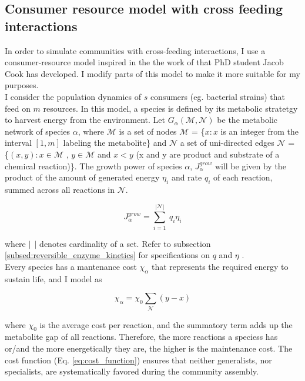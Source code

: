 \documentclass[titlepage,11pt]{article}
\begin{document}
\begin{linenumbers}
			\subsection{Consumer resource model with cross feeding interactions}
			In order to simulate communities with cross-feeding interactions, I use a consumer-resource model inspired in the the work of \citep{Marsland2019} that PhD student Jacob Cook has developed.  I modify parts of this model to make it more suitable for my purposes. \\
			I consider the population dynamics of $ s $ consumers (eg. bacterial strains) that feed on $ m $ resources. In this model,  a species  is defined by its metabolic stratetgy to harvest energy from the environment. Let $ G_{\alpha}(\mathcal{M}, \mathcal{N}) $ be the metabolic network of species $ \alpha $, where $ \mathcal{M} $ is a set of nodes $ \mathcal{M}  $ = \{$x:x $ is an integer from the interval $ [1, m]  $ labeling the metabolite\} and $ \mathcal{N} $ a set of uni-directed edges $ \mathcal{N}  $ = \{$ (x, y): x \in \mathcal{M} \textrm{ , } y \in \mathcal{M} $ and $ x < y $ (x and y are product and substrate of a chemical reaction)\}. The growth power of species $ \alpha $,  $ J^{grow}_{\alpha}$ will be given by the product of the amount of generated energy $ \eta_{i} $ and rate $ q_{i} $ of each reaction, summed across all reactions in $ \mathcal{N} $.
			\begin{linenomath*}	
			\begin{equation}
				J^{grow}_{\alpha} = \sum_{i = 1}^{|\mathcal{N}|} \ q_i \eta_i
			\end{equation}
			\end{linenomath*}
			where $ | \ \ | $ denotes cardinality of a set. Refer to subsection \ref{subsed:reversible_enzyme_kinetics} for specifications on $ q $ and  $ \eta $ .\\
			Every species has a mantenance cost $ \chi_{\alpha} $ that represents the required energy to sustain life, and I model as
			\begin{linenomath*}	
			\begin{equation}\label{eq:cost_function}
				\chi_{\alpha} = \chi_0\sum_{\mathcal{N}}(y - x)
			\end{equation}
			\end{linenomath*}
			where $ \chi_0 $ is the average cost per reaction, and the summatory term adds up the metabolite gap of all reactions. Therefore, the more reactions a speciess has or/and the more energetically they are, the higher is the maintenance cost. The cost function (Eq. \ref{eq:cost_function}) ensures that neither generalists, nor specialists, are systematically favored during the community assembly.\\

\end{linenumbers}
\end{document}
